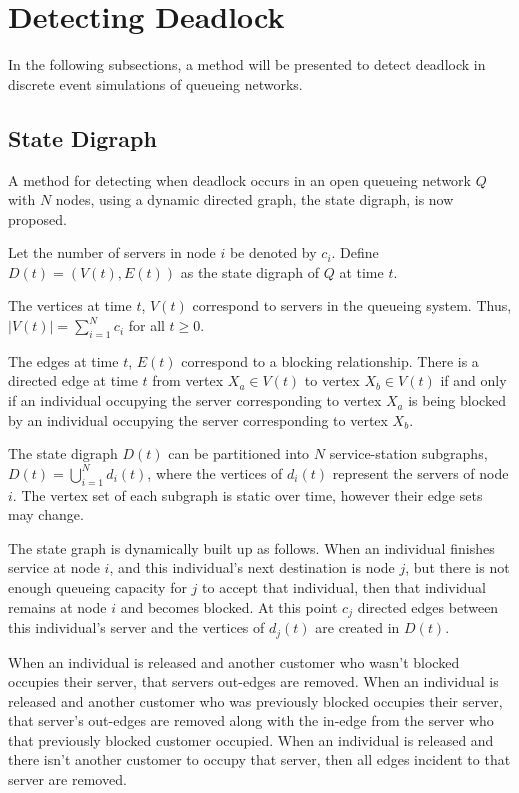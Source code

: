 \documentclass{article}
\begin{document}
\section{Detecting Deadlock}\label{sec:detectdeadlock}
In the following subsections, a method will be presented to detect deadlock in discrete event simulations of queueing networks.

\subsection{State Digraph}

A method for detecting when deadlock occurs in an open queueing network $Q$ with $N$ nodes, using a dynamic directed graph, the state digraph, is now proposed.

Let the number of servers in node $i$ be denoted by $c_i$.
Define $D(t)=(V(t), E(t))$ as the state digraph of $Q$ at time $t$.

The vertices at time \(t\), \(V(t)\) correspond to servers in the
queueing system.
Thus, $\left| V\left(t\right) \right| = \sum_{i=1}^N c_i$ for all $t \geq 0$.

The edges at time \(t\), \(E(t)\) correspond to a blocking relationship.
There is a directed edge at time \(t\) from vertex \(X_a\in V(t)\) to vertex \(X_b\in
V(t)\) if and only if an individual occupying the server corresponding to vertex
\(X_a\) is being blocked by an individual occupying the server corresponding to
vertex \(X_b\).

The state digraph $D(t)$ can be partitioned into $N$ service-station subgraphs,
$D(t)=\bigcup_{i=1}^N d_i(t)$, where the vertices of $d_i(t)$ represent the servers of node $i$.
The vertex set of each subgraph is static over time, however their edge sets may
change.

The state graph is dynamically built up as follows.
When an individual finishes service at node $i$, and this individual's next destination is node $j$, but there is not enough queueing capacity for $j$ to accept that individual, then that individual remains at node $i$ and becomes blocked.
At this point $c_j$ directed edges between this individual's server and the vertices of $d_j(t)$ are created in $D(t)$.

When an individual is released and another customer who wasn't blocked occupies their server, that servers out-edges are removed.
When an individual is released and another customer who was previously blocked occupies their server, that server's out-edges are removed along with the in-edge from the server who that previously blocked customer occupied.
When an individual is released and there isn't another customer to occupy that server, then all edges incident to that server are removed.
\end{document}
